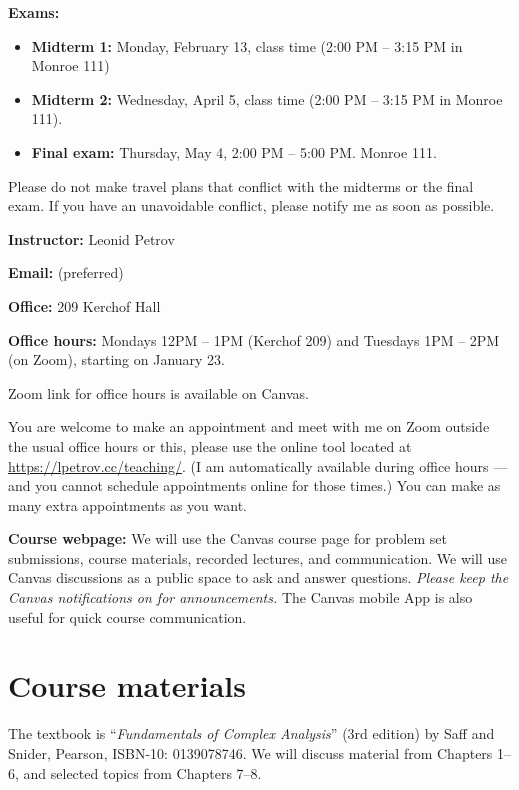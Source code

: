 \documentclass[oneside,11pt]{amsart}
\begin{document}
\medskip

\textbf{Exams:}
\begin{itemize}
	\item \textbf{Midterm 1:} Monday, February 13, class time (2:00 PM -- 3:15 PM in Monroe 111)
	\item \textbf{Midterm 2:} Wednesday, April 5, class time (2:00 PM -- 3:15 PM in Monroe 111).
	\item \textbf{Final exam:} Thursday, May 4, 2:00 PM -- 5:00 PM. Monroe 111.
\end{itemize}
Please do not make travel plans that conflict
with the midterms or the final exam. If you have an unavoidable conflict, please notify me as soon as possible.

\medskip

\textbf{Instructor:} Leonid Petrov
\medskip

\textbf{Email:}  (preferred)
\medskip

\textbf{Office:} 209 Kerchof Hall
\medskip

\textbf{Office hours:}
Mondays 12PM -- 1PM (Kerchof 209) and Tuesdays 1PM -- 2PM (on Zoom), starting on January 23.

Zoom link for office hours is available on Canvas.

\medskip

You are welcome to make an appointment and meet with me on Zoom outside the usual office hours
or this, please use the online tool located at
\url{https://lpetrov.cc/teaching/}. (I am automatically available during office hours --- 
and you cannot schedule appointments online for those times.)
You can make as 
many extra appointments as you want.

\medskip

\textbf{Course webpage:}
We will use the Canvas course page for problem set submissions, course materials, recorded 
lectures, and communication. We will use Canvas discussions as a public space to ask and answer questions. 
\textit{Please keep the Canvas notifications on for announcements.}
The Canvas mobile App is also useful for quick course communication.

\section{Course materials}
\label{sec:textbook}

The textbook is “\emph{Fundamentals of Complex Analysis}” (3rd edition)
by Saff and Snider, Pearson, ISBN-10: 0139078746.
We will discuss material from Chapters 1--6, and selected topics from Chapters 7--8.
\end{document}
